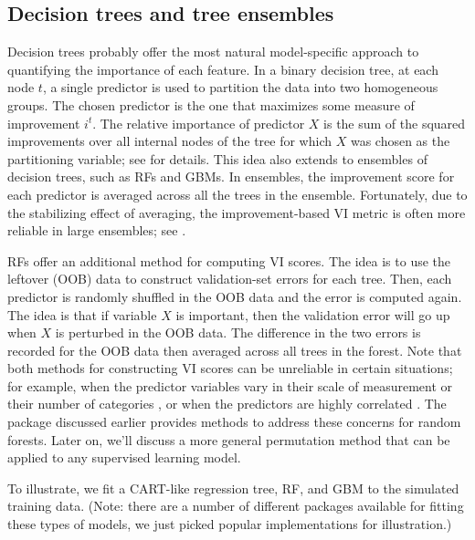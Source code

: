 \subsection{Decision trees and tree ensembles}

Decision trees probably offer the most natural model-specific approach
to quantifying the importance of each feature. In a binary decision
tree, at each node \(t\), a single predictor is used to partition the
data into two homogeneous groups. The chosen predictor is the one that
maximizes some measure of improvement \(i^t\). The relative importance
of predictor \(X\) is the sum of the squared improvements over all
internal nodes of the tree for which \(X\) was chosen as the
partitioning variable; see \citet{classification-breiman-1984} for
details. This idea also extends to ensembles of decision trees, such as
RFs and GBMs. In ensembles, the improvement score for each predictor is
averaged across all the trees in the ensemble. Fortunately, due to the
stabilizing effect of averaging, the improvement-based VI metric is
often more reliable in large ensembles; see
\citet[p. 368]{hastie-elements-2009}.

RFs offer an additional method for computing VI scores. The idea is to
use the leftover  (OOB) data to construct validation-set
errors for each tree. Then, each predictor is randomly shuffled in the
OOB data and the error is computed again. The idea is that if variable
\(X\) is important, then the validation error will go up when \(X\) is
perturbed in the OOB data. The difference in the two errors is recorded
for the OOB data then averaged across all trees in the forest. Note that
both methods for constructing VI scores can be unreliable in certain
situations; for example, when the predictor variables vary in their
scale of measurement or their number of categories \citep{party2007a},
or when the predictors are highly correlated
\citep{strobl-2019-conditional}. The  package discussed
earlier provides methods to address these concerns for random forests.
Later on, we'll discuss a more general permutation method that can be
applied to any supervised learning model.

To illustrate, we fit a CART-like regression tree, RF, and GBM to the
simulated training data. (Note: there are a number of different packages
available for fitting these types of models, we just picked popular
implementations for illustration.)

